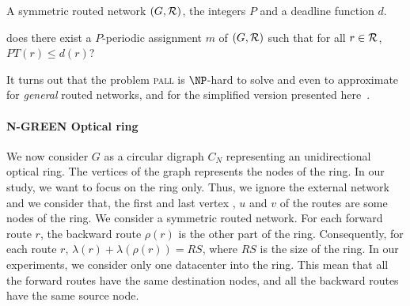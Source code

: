 \documentclass[a4paper,10pt,english]{article}
\newcommand\pall{\textsc{pall}\xspace}
\begin{document}
 
        A symmetric routed network $(G,{\cal R})$, the integers $P$ and a deadline function $d$.
      
       does there exist a $P$-periodic assignment $m$ of $(G,{\cal R})$ such that for all $r \in {\cal R}$, $PT(r) \leq d(r)$?

It turns out that the problem \pall is $\NP$-hard to solve and even to approximate for \emph{general} routed networks, and for the simplified version presented here~\cite{latency2017}.      
          
  \paragraph{N-GREEN Optical ring}
   
 We now consider $G$ as a circular digraph $C_N$ representing an unidirectional optical ring. The vertices of the graph represents the nodes of the ring. In our study, we want to focus on the ring only. Thus, we ignore the external network and we consider that, the first and last vertex , $u$ and $v$ of the routes are some nodes of the ring. We consider a symmetric routed network. For each forward route $r$, the backward route $\rho(r)$ is the other part of the ring. Consequently, for each route $r$, $\lambda(r) + \lambda(\rho(r)) = RS$, where $RS$ is the size of the ring. In our experiments, we consider only one datacenter into the ring. This mean that all the forward routes have the same destination nodes, and all the backward routes have the same source node.
\end{document}
